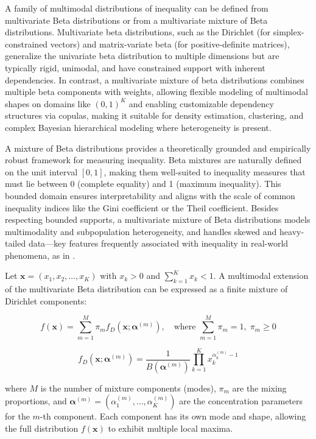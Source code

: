 \documentclass[11pt]{article}
\begin{document}
A family of multimodal distributions of inequality can be defined from multivariate Beta distributions or from a multivariate mixture of Beta distributions. Multivariate beta distributions, such as the Dirichlet (for simplex-constrained vectors) and matrix-variate beta (for positive-definite matrices), generalize the univariate beta distribution to multiple dimensions but are typically rigid, unimodal, and have constrained support with inherent dependencies. In contrast, a multivariate mixture of beta distributions combines multiple beta components with weights, allowing flexible modeling of multimodal shapes on domains like $(0,1)^K$ and enabling customizable dependency structures via copulas, making it suitable for density estimation, clustering, and complex Bayesian hierarchical modeling where heterogeneity is present.

A mixture of Beta distributions provides a theoretically grounded and empirically robust framework for measuring inequality. Beta mixtures are naturally defined on the unit interval $[0,1]$, making them well-suited to inequality measures that must lie between 0 (complete equality) and 1 (maximum inequality). This bounded domain ensures interpretability and aligns with the scale of common inequality indices like the Gini coefficient or the Theil coefficient. Besides respecting bounded supports, a multivariate mixture of Beta distributions models multimodality and subpopulation heterogeneity, and handles skewed and heavy-tailed data—key features frequently associated with inequality in real-world phenomena, as in \citet{de2024small}.

Let $\mathbf{x} = (x_1, x_2, \dots, x_K)$ with $x_k > 0$ and $\sum_{k=1}^{K} x_k < 1$. A multimodal extension of the multivariate Beta distribution can be expressed as a finite mixture of Dirichlet components:

\[
f(\mathbf{x}) = \sum_{m=1}^{M} \pi_m  f_D(\mathbf{x}; \boldsymbol{\alpha}^{(m)}), \quad \text{where } \sum_{m=1}^{M} \pi_m = 1, \; \pi_m \geq 0
\]

\[
f_D(\mathbf{x}; \boldsymbol{\alpha}^{(m)}) = \frac{1}{B(\boldsymbol{\alpha}^{(m)})} \prod_{k=1}^{K} x_k^{\alpha_k^{(m)} - 1}
\]

where $M$ is the number of mixture components (modes), $\pi_m$ are the mixing proportions, and $\boldsymbol{\alpha}^{(m)} = (\alpha_1^{(m)}, \dots, \alpha_K^{(m)})$ are the concentration parameters for the $m$-th component. Each component has its own mode and shape, allowing the full distribution $f(\mathbf{x})$ to exhibit multiple local maxima.
\end{document}
